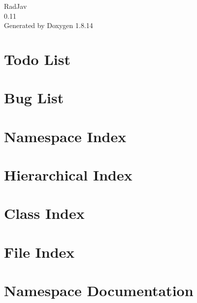 \documentclass[twoside]{book}
\newcommand{\+}{\discretionary{\mbox{\scriptsize$\hookleftarrow$}}{}{}}
\newcommand{\clearemptydoublepage}{%
  \newpage{\pagestyle{empty}\cleardoublepage}%
}
\begin{document}
\hypersetup{pageanchor=false,
             bookmarksnumbered=true,
             pdfencoding=unicode
            }
\begin{titlepage}
\vspace*{7cm}
\begin{center}%
{\Large Rad\+Jav \\[1ex]\large 0.\+11 }\\
\vspace*{1cm}
{\large Generated by Doxygen 1.8.14}\\
\end{center}
\end{titlepage}
\clearemptydoublepage
{}
\tableofcontents
\clearemptydoublepage
{}
\hypersetup{pageanchor=true}

\chapter{Todo List}
\label{todo}

\chapter{Bug List}
\label{bug}

\chapter{Namespace Index}

\chapter{Hierarchical Index}

\chapter{Class Index}

\chapter{File Index}

\chapter{Namespace Documentation}




\end{document}

